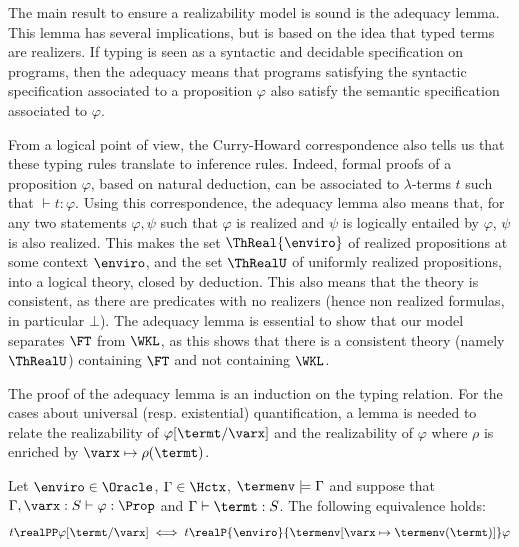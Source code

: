 
The main result to ensure a realizability model is sound is the adequacy lemma. This lemma has several implications, but is based on the idea that typed terms are realizers. If typing is seen as a syntactic and decidable specification on programs, then the adequacy means that programs satisfying the syntactic specification associated to a proposition $\varphi$ also satisfy the semantic specification associated to $\varphi$.

From a logical point of view, the Curry-Howard correspondence also tells us that these typing rules translate to inference rules. Indeed, formal proofs of a proposition $\varphi$, based on natural deduction, can be associated to $\lambda$-terms $t$ such that $\vdash t : \varphi$. Using this correspondence, the adequacy lemma also means that, for any two statements $\varphi,\psi$ such that $\varphi$ is realized and $\psi$ is logically entailed by $\varphi$, $\psi$ is also realized. This makes the set $\ThReal{\enviro}$ of realized propositions at some context $\enviro$, and the set $\ThRealU$ of uniformly realized propositions, into a logical theory, closed by deduction. This also means that the theory is consistent, as there are predicates with no realizers (hence non realized formulas, in particular $\bot$). The adequacy lemma is essential to show that our model separates $\FT$ from $\WKL$, as this shows that there is a consistent theory (namely $\ThRealU$) containing $\FT$ and not containing $\WKL$.

The proof of the adequacy lemma is an induction on the typing relation. For the cases about universal (resp. existential) quantification, a lemma is needed to relate the realizability of $\varphi[\termt/\varx]$ and the realizability of $\varphi$ where $\rho$ is enriched by $\varx\mapsto \rho(\termt)$.

\begin{lemma}
  Let $\enviro \in \Oracle$, $\Gamma \in \Hctx$, $\termenv \models \Gamma$ and suppose that $\Gamma, \varx : S \vdash \varphi : \Prop$ and $\Gamma\vdash \termt : S$. The following equivalence holds:
  \[t \realPP \varphi[\termt/\varx] \iff t \realP{\enviro}{\termenv[\varx\mapsto \termenv(\termt)]}\varphi \]
\end{lemma}


